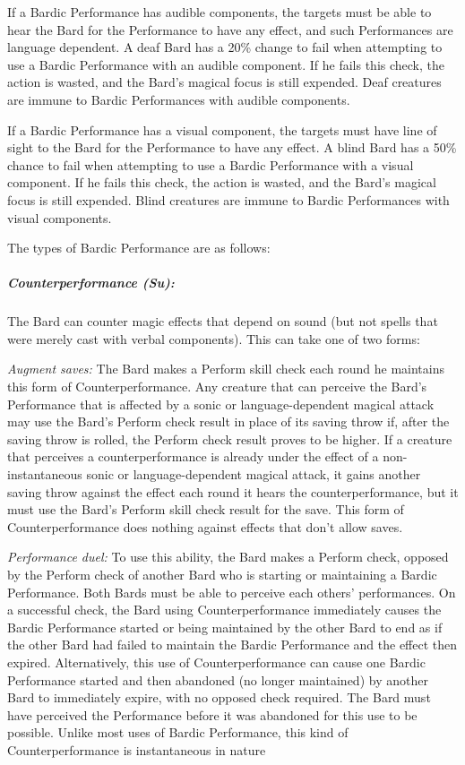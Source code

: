 If a Bardic Performance has audible components, the targets must be able to hear the Bard for the Performance to have any effect, and such Performances are language dependent. A deaf Bard has a 20\% change to fail when attempting to use a Bardic Performance with an audible component. If he fails this check, the action is wasted, and the Bard's magical focus is still expended. Deaf creatures are immune to Bardic Performances with audible components.

If a Bardic Performance has a visual component, the targets must have line of sight to the Bard for the Performance to have any effect. A blind Bard has a 50\% chance to fail when attempting to use a Bardic Performance with a visual component. If he fails this check, the action is wasted, and the Bard's magical focus is still expended. Blind creatures are immune to Bardic Performances with visual components.

The types of Bardic Performance are as follows:
\subparagraph{Counterperformance (Su):}
The Bard can counter magic effects that depend on sound (but not spells that were merely cast with verbal components). 
This can take one of two forms:
 
\begin{list}{}{\leftmargin=1em}
 \item \emph{Augment saves:} The Bard makes a Perform skill check each round he maintains this form of Counterperformance.
Any creature that can perceive the Bard's Performance that is affected by a sonic or language-dependent magical attack may use the Bard's Perform check result in place of its saving throw if, after the saving throw is rolled, the Perform check result proves to be higher. 
If a creature that perceives a counterperformance is already under the effect of a non-instantaneous sonic or language-dependent magical attack, it gains another saving throw against the effect each round it hears the counterperformance, but it must use the Bard's Perform skill check result for the save. 
This form of Counterperformance does nothing against effects that don't allow saves.
 \item \emph{Performance duel:} To use this ability, the Bard makes a Perform check, opposed by the Perform check of another Bard who is starting or maintaining a Bardic Performance. Both Bards must be able to perceive each others' performances. On a successful check, the Bard using Counterperformance immediately causes the Bardic Performance started or being maintained by the other Bard to end as if the other Bard had failed to maintain the Bardic Performance and the effect then expired.
 Alternatively, this use of Counterperformance can cause one Bardic Performance started and then abandoned (no longer maintained) by another Bard to immediately expire, with no opposed check required. The Bard must have perceived the Performance before it was abandoned for this use to be possible.
 Unlike most uses of Bardic Performance, this kind of Counterperformance is instantaneous in nature
\end{list}

